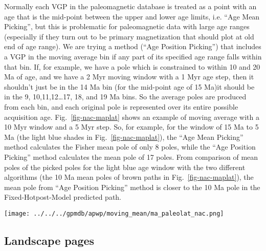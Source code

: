 Normally each VGP in the paleomagnetic database is treated as a point with an
age that is the mid-point between the upper and lower age limits, i.e. ``Age
Mean Picking'', but this is problematic for paleomagnetic data with large age
ranges (especially if they turn out to be primary magnetization that should
plot at old end of age range). We are trying a method (``Age Position Picking'')
that includes a VGP in the moving average bin if any part of its specified age
range falls within that bin. If, for example, we have a pole which is
constrained to within 10 and 20 Ma of age, and we have a 2 Myr moving window
with a 1 Myr age step, then it shouldn't just be in the 14 Ma bin
(for the mid-point age of 15 Ma)\textemdash{}it should be in the 9,
10,11,12\ldots17,
18, and 19 Ma bins. So the average poles are produced
from each bin, and each original pole is represented over its entire possible
acquisition age. Fig.~\ref{fig-nac-maplat} shows an example of moving average
with a 10 Myr window and a 5 Myr step. So, for example, for the window of 15 Ma
to 5 Ma (the light blue shades in Fig.~\ref{fig-nac-maplat}), the ``Age Mean
Picking'' method calculates the Fisher mean pole of only 8 poles, while the
``Age Position Picking'' method calculates the mean pole of 17 poles. From
comparison of mean poles of the picked poles for the light blue age window with
the two different algorithms (the 10 Ma mean poles of brown paths in
Fig.~\ref{fig-nac-maplat}), the mean pole from ``Age Position Picking'' method
is closer to the 10 Ma pole in the Fixed-Hotpost-Model predicted path.

\begin{figure*}[tbp]
\centering
\texttt{[image: ../../../gpmdb/apwp/moving\_mean/ma\_paleolat\_nac.png]}
\caption[Moving average (MA) methods]{An example of 10 Myr moving window and 5
Myr step in the moving average method, based on poles of the NAC. Every age
window has a different color. Red points are the midpoints of low and high
magnetic ages. The vertical axis has no specific meaning here.
}\label{fig-nac-maplat}
\end{figure*}

\subsection{Landscape pages}\label{classoptions}

